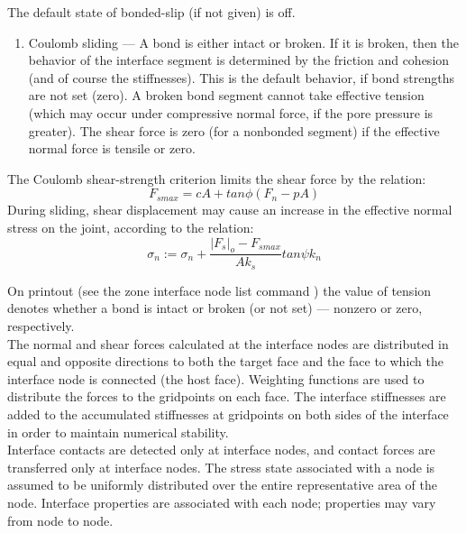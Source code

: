 \documentclass[a4paper, nobind]{templates/ociamthesis}
\providecommand{\tightlist}{%
  \setlength{\itemsep}{0pt}\setlength{\parskip}{0pt}}
\begin{document}
The default state of bonded-slip (if not given) is off.

\begin{enumerate}
\def\labelenumi{\arabic{enumi}.}
\setcounter{enumi}{2}
\tightlist
\item
  Coulomb sliding --- A bond is either intact or broken. If it is broken, then the behavior of the interface segment is determined by the friction and cohesion (and of course the stiffnesses). This is the default behavior, if bond strengths are not set (zero). A broken bond segment cannot take effective tension (which may occur under compressive normal force, if the pore pressure is greater). The shear force is zero (for a nonbonded segment) if the effective normal force is tensile or zero.\\
\end{enumerate}

The Coulomb shear-strength criterion limits the shear force by the relation:\\

\[ F_{smax} = c A + tan\phi (F_n - pA)\]
During sliding, shear displacement may cause an increase in the effective normal stress on the joint, according to the relation:\\

\[\sigma_n := \sigma_n + \frac{|F_s|_o - F_{smax}}{A k_s} tan\psi k_n\]

On printout (see the zone interface node list command ) the value of tension denotes whether a bond is intact or broken (or not set) --- nonzero or zero, respectively.\\

The normal and shear forces calculated at the interface nodes are distributed in equal and opposite directions to both the target face and the face to which the interface node is connected (the host face). Weighting functions are used to distribute the forces to the gridpoints on each face. The interface stiffnesses are added to the accumulated stiffnesses at gridpoints on both sides of the interface in order to maintain numerical stability.\\

Interface contacts are detected only at interface nodes, and contact forces are transferred only at interface nodes. The stress state associated with a node is assumed to be uniformly distributed over the entire representative area of the node. Interface properties are associated with each node; properties may vary from node to node.\\
\end{document}

